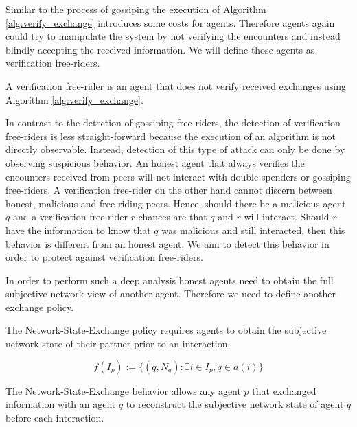 Similar to the process of gossiping the execution of Algorithm \ref{alg:verify_exchange} introduces
some costs for agents. Therefore agents again could try to manipulate the system by not verifying 
the encounters and instead blindly accepting the received information. We will define those agents
as verification free-riders.

\begin{defn}
    A verification free-rider is an agent that does not verify received exchanges using Algorithm 
    \ref{alg:verify_exchange}.
\end{defn}

In contrast to the detection of gossiping free-riders, the detection of verification free-riders is
less straight-forward because the execution of an algorithm is not directly observable. Instead, 
detection of this type of attack can only be done by observing suspicious behavior. An honest agent
that always verifies the encounters received from peers will not interact with double spenders or 
gossiping free-riders. A verification free-rider on the other hand cannot discern between honest,
malicious and free-riding peers. Hence, should there be a malicious agent $q$ and a verification 
free-rider $r$ chances are that $q$ and $r$ will interact. Should $r$ have the information to know 
that $q$ was malicious and still interacted, then this behavior is different from an honest agent.
We aim to detect this behavior in order to protect against verification free-riders.

In order to perform such a deep analysis honest agents need to obtain the full subjective network 
view of another agent. Therefore we need to define another exchange policy.

\begin{pol}
    \label{pol:network_state}
    The Network-State-Exchange policy requires agents to obtain the subjective network state of their partner 
    prior to an interaction. 

    \[ f(I_p) := \{ (q, N_q) : \exists i \in I_p, q \in a(i) \}\]
\end{pol}

The Network-State-Exchange behavior allows any agent $p$ that exchanged information with an agent $q$
to reconstruct the subjective network state of agent $q$ before each interaction. 



